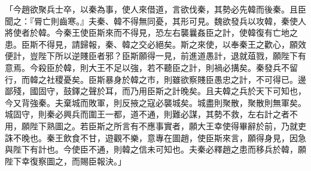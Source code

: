\begin{pinyinscope}
「今趙欲聚兵士卒，以秦為事，使人來借道，言欲伐秦，其勢必先韓而後秦。且臣聞之：『脣亡則齒寒。』夫秦、韓不得無同憂，其形可見。魏欲發兵以攻韓，秦使人將使者於韓。今秦王使臣斯來而不得見，恐左右襲曩姦臣之計，使韓復有亡地之患。臣斯不得見，請歸報，秦、韓之交必絕矣。斯之來使，以奉秦王之歡心，願效便計，豈陛下所以逆賤臣者邪？臣斯願得一見，前進道愚計，退就葅戮，願陛下有意焉。今殺臣於韓，則大王不足以強，若不聽臣之計，則禍必搆矣。秦發兵不留行，而韓之社稷憂矣。臣斯暴身於韓之市，則雖欲察賤臣愚忠之計，不可得已。邊鄙殘，國固守，鼓鐸之聲於耳，而乃用臣斯之計晚矣。且夫韓之兵於天下可知也，今又背強秦。夫棄城而敗軍，則反掖之寇必襲城矣。城盡則聚散，聚散則無軍矣。城固守，則秦必興兵而圍王一都，道不通，則難必謀，其勢不救，左右計之者不用，願陛下熟圖之。若臣斯之所言有不應事實者，願大王幸使得畢辭於前，乃就吏誅不晚也。秦王飲食不甘，遊觀不樂，意專在圖趙，使臣斯來言，願得身見，因急與陛下有計也。今使臣不通，則韓之信未可知也。夫秦必釋趙之患而移兵於韓，願陛下幸復察圖之，而賜臣報決。」


\end{pinyinscope}